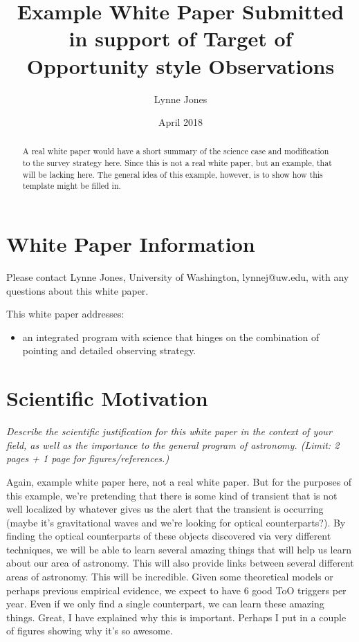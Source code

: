 \documentclass[11pt]{article}
\title{Example White Paper Submitted in support of Target of Opportunity style Observations}
\author{Lynne Jones}
\date{April 2018}
\begin{document}
\maketitle

\begin{abstract}
A real white paper would have a short summary of the science case and modification to the survey strategy
here. Since this is not a real white paper, but an example, that will be lacking here. The general idea of this
example, however, is to show how this template might be filled in. 
\end{abstract}

\section{White Paper Information}
Please contact Lynne Jones, University of Washington, lynnej@uw.edu, with any questions about this white paper. 

This white paper addresses:
\begin{itemize} 
\item an integrated program with science that hinges on the combination of pointing and detailed 
	observing strategy.
\end{itemize}  

\clearpage

\section{Scientific Motivation}

\begin{footnotesize}
{\it Describe the scientific justification for this white paper in the context
of your field, as well as the importance to the general program of astronomy. 
(Limit: 2 pages + 1 page for figures/references.)}
\end{footnotesize}

Again, example white paper here, not a real white paper. But for the purposes of this
example, we're pretending that there is some kind of transient that is not well localized
by whatever gives us the alert that the transient is occurring (maybe it's gravitational waves 
and we're looking for optical counterparts?).  By finding the optical counterparts of
these objects discovered via very different techniques, we will be able to learn 
several amazing things that will help us learn about our area of astronomy. This will 
also provide links between several different areas of astronomy. This will be incredible. 
Given some theoretical models or perhaps previous empirical evidence, we expect to have 6 good ToO triggers per year. 
Even if we only find a single counterpart, we can learn these amazing things.
Great, I have explained why this is important.  Perhaps I put in a couple of figures showing why it's so awesome.
\end{document}
